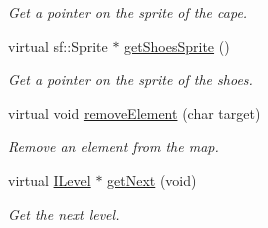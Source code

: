 \begin{DoxyCompactItemize}
\begin{DoxyCompactList}\small\item\em Get a pointer on the sprite of the cape. \end{DoxyCompactList}\item 
virtual sf\-::\-Sprite $\ast$ \hyperlink{class_level_two_ae382cc1e788e71eadcef2b5946ee204e}{get\-Shoes\-Sprite} ()
\begin{DoxyCompactList}\small\item\em Get a pointer on the sprite of the shoes. \end{DoxyCompactList}\item 
virtual void \hyperlink{class_level_two_a87ad50b6da9f82ecf602c789d354acae}{remove\-Element} (char target)
\begin{DoxyCompactList}\small\item\em Remove an element from the map. \end{DoxyCompactList}\item 
virtual \hyperlink{class_i_level}{I\-Level} $\ast$ \hyperlink{class_level_two_a4f0b0678a51169126fdd0e354ff4fa0e}{get\-Next} (void)
\begin{DoxyCompactList}\small\item\em Get the next level. \end{DoxyCompactList}\end{DoxyCompactItemize}

